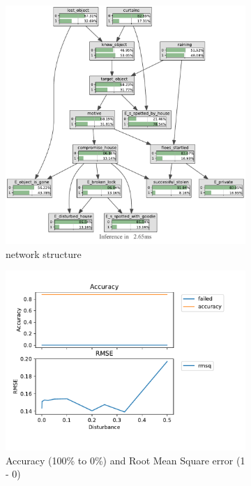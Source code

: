 \begin{figure}[h]
\begin{center}
\begin{subfigure}{.7\textwidth}
\includegraphics[width=\linewidth]{../experiments/StolenLaptop/bnImage/BNIMAGEStolenLaptop.pdf}
\caption{network structure}
\label{laptopAcc}
\end{subfigure}
\end{center}

\begin{subfigure}{.5\textwidth}

\includegraphics[width=\linewidth]{../experiments/StolenLaptop/plots/performance_StolenLaptop.pdf}
\caption{Accuracy (100\% to 0\%) and Root Mean Square error (1 - 0) }
\label{laptopAcc}
\end{subfigure}
\begin{subfigure}{.5\textwidth}


\end{subfigure}
\end{figure}
